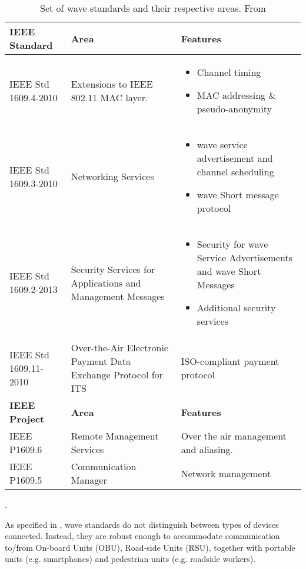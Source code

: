 \begin{sidewaystable}
    \centering
    \begin{tabular}{|p{5cm}|p{5cm}|p{9cm}|}
        \hline
         \textbf{IEEE Standard} & \textbf{Area} & \textbf{Features} \\
         \hline
         IEEE Std 1609.4-2010 & Extensions to IEEE 802.11 MAC layer. & 
         \begin{itemize}[nolistsep,noitemsep, topsep=0pt]
             \item Channel timing
             \item MAC addressing \& pseudo-anonymity
         \end{itemize} \\ \hline
         IEEE Std 1609.3-2010 & Networking Services & 
         \begin{itemize}[nolistsep,noitemsep, topsep=0pt]
             \item \acrshort{wave} service advertisement and channel scheduling
             \item \acrshort{wave} Short message protocol
         \end{itemize} \\ \hline
         IEEE Std 1609.2-2013 & Security Services for Applications and Management Messages &
         \begin{itemize}[nolistsep,noitemsep, topsep=0pt]
             \item Security for \acrshort{wave} Service Advertisements and \acrshort{wave} Short Messages
             \item Additional security services
         \end{itemize} \\ \hline
        IEEE Std 1609.11-2010 & Over-the-Air Electronic Payment Data Exchange Protocol for ITS & ISO-compliant payment protocol \\ \hline \hline
        \textbf{IEEE Project} & \textbf{Area} & \textbf{Features} \\ \hline
        IEEE P1609.6  & Remote Management Services & Over the air management and aliasing. \\ \hline
        IEEE P1609.5  & Communication Manager & Network management \\ \hline
    \end{tabular}
    \caption{Set of \acrshort{wave} standards and their respective areas. From \cite{VehicularTechnologySociety2014IEEEArchitecture}}.
    \label{tab:wave-stds}
\end{sidewaystable}
% 
As specified in \cite{VehicularTechnologySociety2014IEEEArchitecture}, \acrshort{wave} standards do not distinguish between types of devices connected. Instead, they are robust enough to accommodate communication to/from On-board Units (OBU), Road-side Units (RSU), together with portable units (e.g. smartphones) and pedestrian units (e.g. roadside workers). 
% 
